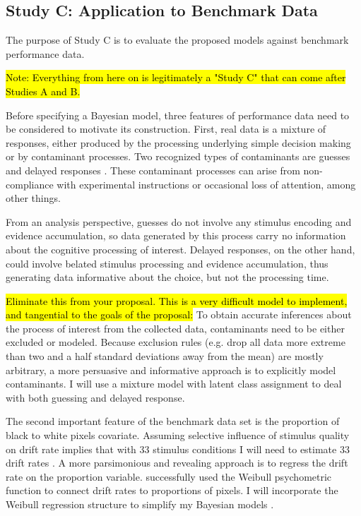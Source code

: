 \documentclass[12pt]{article}
\newcommand{\trish}[1]{\textrm{\hl{#1}}}
\begin{document}
\subsection{Study C: Application to Benchmark Data}


The purpose of Study C is to evaluate the proposed models
against benchmark performance data. 

\trish{Note: Everything from here on is legitimately a "Study C" that
can come after Studies A and B.}
    
Before specifying a Bayesian model, three features of performance data
need to be considered to motivate its construction. First, real data
is a mixture of responses, either produced by the processing
underlying simple decision making or by contaminant processes. Two
recognized types of contaminants are guesses and delayed responses
\citep{Rat1993,RatTue2002,VanTue2007,VanTue2008,
VanTue2011,CraPer2010}. These contaminant processes can arise from
non-compliance with experimental instructions or occasional loss of
attention, among other things.
    
From an analysis perspective, guesses do not involve any
stimulus encoding and evidence accumulation, so data generated by this
process carry no information about the cognitive processing of
interest. Delayed responses, on the other hand, could involve
belated stimulus processing and evidence accumulation, thus generating
data informative about the choice, but not the processing time.
    
\trish{Eliminate this from your proposal.  This is a very difficult
model to implement, and tangential to the goals of the proposal:} To
obtain accurate inferences about the process of interest from the
collected data, contaminants need to be either excluded or
modeled. Because exclusion rules (e.g. drop all data more extreme than
two and a half standard deviations away from the mean) are mostly
arbitrary, a more persuasive and informative approach is to explicitly
model contaminants. I will use a mixture model with latent class
assignment to deal with both guessing and delayed response.
    
The second important feature of the benchmark data set is the
proportion of black to white pixels covariate. Assuming selective
influence of stimulus quality on drift rate implies that with 33
stimulus conditions I will need to estimate 33 drift rates
\citep{VosRot2004}. A more parsimonious and revealing approach is to
regress the drift rate on the proportion
variable. \citet{VanTue2008,VanTue2011} successfully used the Weibull
psychometric function to connect drift rates to proportions of
pixels. I will incorporate the Weibull regression structure to
simplify my Bayesian models \citep{PerVan2002,Rat2014}.
    
\end{document}
